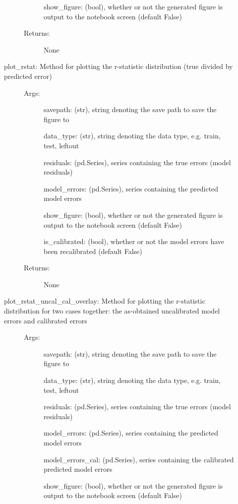 \documentclass[letterpaper,10pt,english]{sphinxmanual}
\begin{document}
\begin{fulllineitems}
\begin{description}
\begin{description}
\begin{description}
show\_figure: (bool), whether or not the generated figure is output to the notebook screen (default False)

\item[{Returns:}] \leavevmode
None

\end{description}

\item[{plot\_rstat: Method for plotting the r-statistic distribution (true divided by predicted error)}] \leavevmode\begin{description}
\item[{Args:}] \leavevmode
savepath: (str), string denoting the save path to save the figure to

data\_type: (str), string denoting the data type, e.g. train, test, leftout

residuals: (pd.Series), series containing the true errors (model residuals)

model\_errors: (pd.Series), series containing the predicted model errors

show\_figure: (bool), whether or not the generated figure is output to the notebook screen (default False)

is\_calibrated: (bool), whether or not the model errors have been recalibrated (default False)

\item[{Returns:}] \leavevmode
None

\end{description}

\item[{plot\_rstat\_uncal\_cal\_overlay: Method for plotting the r-statistic distribution for two cases together: the as-obtained uncalibrated model errors and calibrated errors}] \leavevmode\begin{description}
\item[{Args:}] \leavevmode
savepath: (str), string denoting the save path to save the figure to

data\_type: (str), string denoting the data type, e.g. train, test, leftout

residuals: (pd.Series), series containing the true errors (model residuals)

model\_errors: (pd.Series), series containing the predicted model errors

model\_errors\_cal: (pd.Series), series containing the calibrated predicted model errors

show\_figure: (bool), whether or not the generated figure is output to the notebook screen (default False)


\end{description}
\end{description}
\end{description}
\end{fulllineitems}
\end{document}
